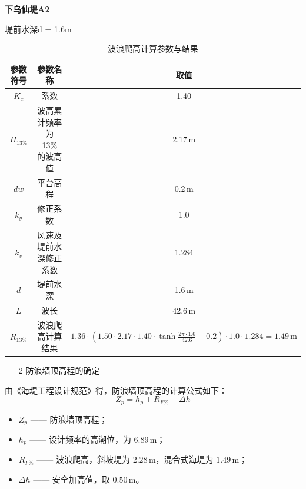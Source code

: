 \documentclass[UTF8, a4paper, 12pt]{ctexart} %
\begin{document}
\par

\textbf{下乌仙堤A2}

\par
堤前水深d = 1.6m
\par

\begin{table}[h]
    \centering
    \caption{波浪爬高计算参数与结果}
    \begin{tabular}{|c|c|c|}
        \hline
        参数符号 & 参数名称 & 取值 \\ \hline
        $K_z$ & 系数 & 1.40 \\ \hline
        $H_{13\%}$ & 波高累计频率为 13\% 的波高值 & 2.17\,m \\ \hline
        $dw$ & 平台高程 & 0.2\,m \\ \hline
        $k_y$ & 修正系数 & 1.0 \\ \hline
        $k_v$ & 风速及堤前水深修正系数 & 1.284 \\ \hline
        $d$ & 堤前水深 & 1.6\,m \\ \hline
        $L$ & 波长 & 42.6\,m \\ \hline
        $R_{13\%}$ & 波浪爬高计算结果 & $1.36 \cdot \left( 1.50 \cdot 2.17 \cdot 1.40 \cdot \tanh \frac{2 \pi \cdot 1.6}{42.6} - 0.2 \right) \cdot 1.0 \cdot 1.284 = 1.49\,\text{m}$ \\ \hline
    \end{tabular}
    \label{tab:wave_runup_calculation}
\end{table}


\begin{itemize}
    \item [2] 防浪墙顶高程的确定
\end{itemize}
由《海堤工程设计规范》得，防浪墙顶高程的计算公式如下：
\begin{equation}
    Z_p = h_p + R_{F\%} + \Delta h
\end{equation}

\begin{itemize}
    \item $Z_p$ —— 防浪墙顶高程；
    \item $h_p$ —— 设计频率的高潮位，为 $6.89\,\text{m}$；
    \item $R_{F\%}$ —— 波浪爬高，斜坡堤为 $2.28\,\text{m}$，混合式海堤为 $1.49\,\text{m}$；
    \item $\Delta h$ —— 安全加高值，取 $0.50\,\text{m}$。
\end{itemize}
\end{document}
